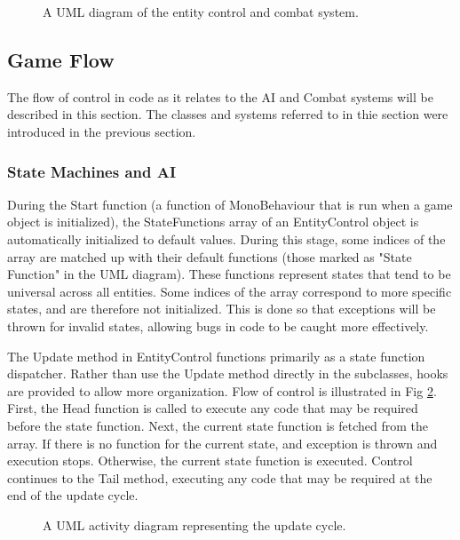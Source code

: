 \documentclass{article}
\begin{document}
\begin{figure}[h!]

{

}
\caption{A UML diagram of the entity control and combat system.}
\label{AI_Combat}
\end{figure}








\subsection{Game Flow}

The flow of control in code as it relates to the AI and Combat systems will be described in this section.  The classes and systems referred to in thie section were introduced in the previous section.

\subsubsection{State Machines and AI}

During the Start function (a function of MonoBehaviour that is run when a game object is initialized), the StateFunctions array of an EntityControl object is automatically initialized to default values.  During this stage, some indices of the array are matched up with their default functions (those marked as "State Function" in the UML diagram).  These functions represent states that tend to be universal across all entities.  Some indices of the array correspond to more specific states, and are therefore not initialized.  This is done so that exceptions will be thrown for invalid states, allowing bugs in code to be caught more effectively.

The Update method in EntityControl functions primarily as a state function dispatcher.  Rather than use the Update method directly in the subclasses, hooks are provided to allow more organization.  Flow of control is illustrated in Fig \ref{UpdateCycle}.  First, the Head function is called to execute any code that may be required before the state function.  Next, the current state function is fetched from the array.  If there is no function for the current state, and exception is thrown and execution stops.  Otherwise, the current state function is executed.  Control continues to the Tail method, executing any code that may be required at the end of the update cycle.

\begin{figure}[h!]
{

}
\caption{A UML activity diagram representing the update cycle.}
\label{UpdateCycle}
\end{figure}
\end{document}
